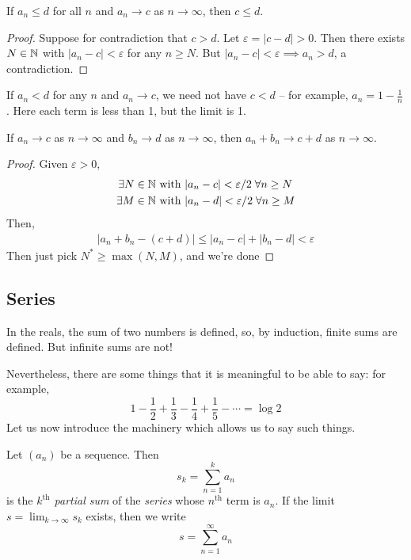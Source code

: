 \documentclass{../../template/note}
\begin{document}
    \begin{proposition}
        If \(a_n \leq d\) for all \(n\) and \(a_n \to c\) as \(n \to \infty\), then \(c \leq d\).
    \end{proposition}
    
    \begin{proof}
        Suppose for contradiction that \(c > d\). Let \(\varepsilon = |c-d| > 0\). Then there exists \(N \in \mathbb N\) with \(|a_n - c| < \varepsilon\) for any \(n \geq N\). But \(|a_n - c| < \varepsilon \implies a_n > d\), a contradiction.
    \end{proof}
    
    \begin{remark*}
        If \(a_n < d\) for any \(n\) and \(a_n \to c\), we need not have \(c < d\) -- for example, \(a_n = 1 - \frac 1 n\). Here each term is less than 1, but the limit is 1.
    \end{remark*}
    
    \begin{proposition}
        If \(a_n \to c\) as \(n \to \infty\) and \(b_n \to d\) as \(n \to \infty\), then \(a_n + b_n \to c + d\) as \(n \to \infty\).
    \end{proposition}
    
    \begin{proof}
        Given \(\varepsilon > 0\),
        \begin{align*}
            \exists N \in \mathbb N \text{ with } &|a_n - c| < \varepsilon/2 \; \forall n \geq N \\
            \exists M \in \mathbb N \text{ with } &|a_n - d| < \varepsilon/2 \; \forall n \geq M
        \end{align*}
        Then,
        \begin{align*}
            |a_n + b_n - (c + d)| \leq |a_n - c| + |b_n - d| < \varepsilon
        \end{align*}
        Then just pick \(N^* \geq \max(N, M)\), and we're done
    \end{proof}

    
    \subsection{Series}

    In the reals, the sum of two numbers is defined, so, by induction, finite sums are defined. But infinite sums are not!

    Nevertheless, there are some things that it is meaningful to be able to say: for example,
    \[
        1 - \frac 1 2 + \frac 1 3 - \frac 1 4 + \frac 1 5 - \cdots = \log 2
    \]
    Let us now introduce the machinery which allows us to say such things.
    \begin{definition}
        Let \((a_n)\) be a sequence. Then
        \[
            s_k = \sum_{n=1}^k a_n
        \]
        is the \emph{\(k^\text{th}\) partial sum} of the \emph{series} whose \(n^\text{th}\) term is \(a_n\). If the limit \(s = \lim_{k \to \infty}s_k\) exists, then we write
        \[  
            s = \sum_{n=1}^\infty a_n
        \]
    \end{definition}
    
\end{document}
